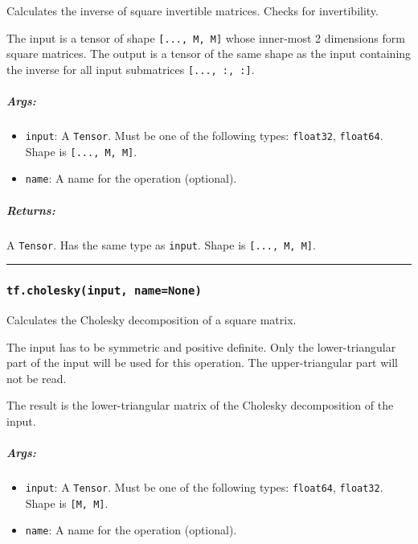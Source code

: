 Calculates the inverse of square invertible matrices. Checks for
invertibility.

The input is a tensor of shape \texttt{{[}...,\ M,\ M{]}} whose
inner-most 2 dimensions form square matrices. The output is a tensor of
the same shape as the input containing the inverse for all input
submatrices \texttt{{[}...,\ :,\ :{]}}.

\subparagraph{Args: }\label{args-30}

\begin{itemize}
\tightlist
\item
  \texttt{input}: A \texttt{Tensor}. Must be one of the following types:
  \texttt{float32}, \texttt{float64}. Shape is
  \texttt{{[}...,\ M,\ M{]}}.
\item
  \texttt{name}: A name for the operation (optional).
\end{itemize}

\subparagraph{Returns: }\label{returns-30}

A \texttt{Tensor}. Has the same type as \texttt{input}. Shape is
\texttt{{[}...,\ M,\ M{]}}.

\begin{center}\rule{0.5\linewidth}{\linethickness}\end{center}

\subsubsection{\texorpdfstring{\texttt{tf.cholesky(input,\ name=None)}
}{tf.cholesky(input, name=None) }}\label{tf.choleskyinput-namenone}

Calculates the Cholesky decomposition of a square matrix.

The input has to be symmetric and positive definite. Only the
lower-triangular part of the input will be used for this operation. The
upper-triangular part will not be read.

The result is the lower-triangular matrix of the Cholesky decomposition
of the input.

\subparagraph{Args: }\label{args-31}

\begin{itemize}
\tightlist
\item
  \texttt{input}: A \texttt{Tensor}. Must be one of the following types:
  \texttt{float64}, \texttt{float32}. Shape is \texttt{{[}M,\ M{]}}.
\item
  \texttt{name}: A name for the operation (optional).
\end{itemize}


